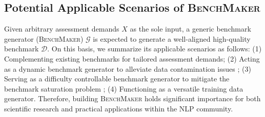 \subsection{Potential Applicable Scenarios of \textsc{BenchMaker}}
\label{sec:app}
Given arbitrary assessment demands $X$ as the sole input, a generic benchmark generator (\textsc{BenchMaker}) $\mathcal{G}$ is expected to generate a well-aligned high-quality benchmark $\mathcal{D}$.
On this basis, we summarize its applicable scenarios as follows: (1) Complementing existing benchmarks for tailored assessment demands; (2) Acting as a dynamic benchmark generator to alleviate data contamination issues \citep{datacontamination}; (3) Serving as a difficulty controllable benchmark generator to mitigate the benchmark saturation problem \citep{saturation}; (4) Functioning as a versatile training data generator. 
Therefore, building \textsc{BenchMaker} holds significant importance for both scientific research and practical applications within the NLP community. 